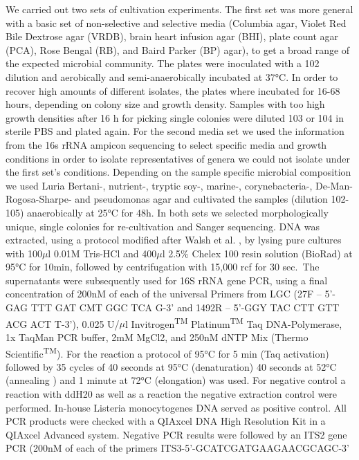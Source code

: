 \documentclass[preprint, 3p,
authoryear]{elsarticle} %
\begin{document}
We carried out two sets of cultivation experiments. The first set was
more general with a basic set of non-selective and selective media
(Columbia agar, Violet Red Bile Dextrose agar (VRDB), brain heart
infusion agar (BHI), plate count agar (PCA), Rose Bengal (RB), and Baird
Parker (BP) agar), to get a broad range of the expected microbial
community. The plates were inoculated with a 102 dilution and
aerobically and semi-anaerobically incubated at 37°C. In order to
recover high amounts of different isolates, the plates where incubated
for 16-68 hours, depending on colony size and growth density. Samples
with too high growth densities after 16 h for picking single colonies
were diluted 103 or 104 in sterile PBS and plated again. For the second
media set we used the information from the 16s rRNA ampicon sequencing
to select specific media and growth conditions in order to isolate
representatives of genera we could not isolate under the first set's
conditions. Depending on the sample specific microbial composition we
used Luria Bertani-, nutrient-, tryptic soy-, marine-, corynebacteria-,
De-Man-Rogosa-Sharpe- and pseudomonas agar and cultivated the samples
(dilution 102-105) anaerobically at 25°C for 48h. In both sets we
selected morphologically unique, single colonies for re-cultivation and
Sanger sequencing. DNA was extracted, using a protocol modified after
Walsh et al. \citep{Walsh.2013}, by lysing pure cultures with
100\(\mu\)l 0.01M Tris-HCl and 400\(\mu\)l 2.5\% Chelex 100 resin
solution (BioRad) at 95°C for 10min, followed by centrifugation with
15,000 rcf for 30 sec.~The supernatants were subsequently used for 16S
rRNA gene PCR, using a final concentration of 200nM of each of the
universal Primers from LGC (27F -- 5'-GAG TTT GAT CMT GGC TCA G-3' and
1492R -- 5'-GGY TAC CTT GTT ACG ACT T-3'), 0.025 U/\(\mu\)l
Invitrogen\textsuperscript{TM} Platinum\textsuperscript{TM} Taq
DNA-Polymerase, 1x TaqMan PCR buffer, 2mM MgCl2, and 250nM dNTP Mix
(Thermo Scientific\textsuperscript{TM}). For the reaction a protocol of
95°C for 5 min (Taq activation) followed by 35 cycles of 40 seconds at
95°C (denaturation) 40 seconds at 52°C (annealing ) and 1 minute at 72°C
(elongation) was used. For negative control a reaction with ddH20 as
well as a reaction the negative extraction control were performed.
In-house Listeria monocytogenes DNA served as positive control. All PCR
products were checked with a QIAxcel DNA High Resolution Kit in a
QIAxcel Advanced system. Negative PCR results were followed by an ITS2
gene PCR (200nM of each of the primers ITS3-5'-GCATCGATGAAGAACGCAGC-3'
\end{document}
